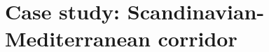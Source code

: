 \documentclass[preprint,10pt,review, authoryear]{elsarticle}
\begin{document}
    
\newpage

\section{Case study: Scandinavian-Mediterranean corridor}
\end{document}
